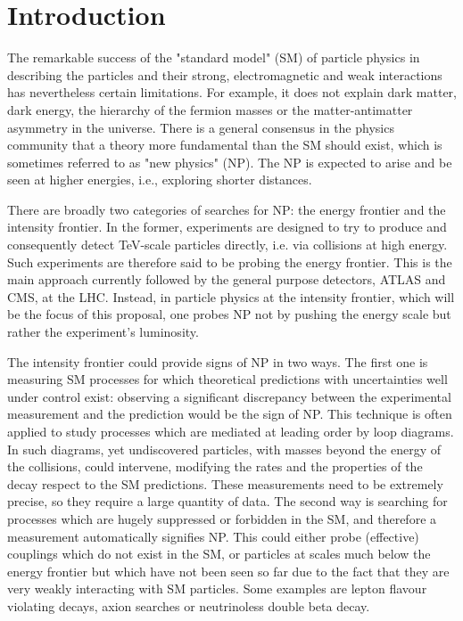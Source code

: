 
\section{Introduction}

The remarkable success of the "standard model" (SM) of particle physics in describing the particles and their strong, electromagnetic and weak interactions has nevertheless certain limitations. For example, it does not explain dark matter, dark energy, the hierarchy of the fermion masses or the matter-antimatter asymmetry in the universe. There is a general consensus in the physics community that a theory more fundamental than the SM should exist, which is sometimes referred to as "new physics" (NP). The NP is expected to arise and be seen at higher energies, i.e., exploring shorter distances.

There are broadly two categories of searches for NP: the energy frontier and the intensity frontier.  In the former, experiments are designed to try to produce and consequently detect TeV-scale particles directly, i.e. via collisions at high energy.  
Such experiments are therefore said to be probing the energy frontier. This is the main approach currently followed by the general purpose detectors, ATLAS and CMS, at the LHC. 
Instead, in particle physics at the intensity frontier, which will be the focus of this proposal,  one probes NP not by pushing the energy scale but rather the experiment's luminosity.

The intensity frontier could provide signs of NP in two ways. The first one is  measuring SM processes for which theoretical predictions with uncertainties well under control  exist:  observing a significant discrepancy between the experimental measurement and the prediction  would be the sign of NP. This technique is often applied to study processes which are mediated at leading order by loop diagrams. In such diagrams, yet undiscovered particles, with masses beyond the energy of the collisions, could  intervene, modifying the rates and the properties of the decay respect to the SM predictions. These measurements need to be extremely precise, so they require a large quantity of data.  The second way is searching for processes which are hugely suppressed or forbidden  in the SM, and therefore a measurement automatically signifies NP. This could either probe (effective) couplings which do not exist in the SM, or particles at scales much below the energy frontier but which have not  been seen so far due to the fact that they are very weakly interacting with SM particles. Some examples are lepton flavour violating decays, axion searches or neutrinoless double beta decay.

